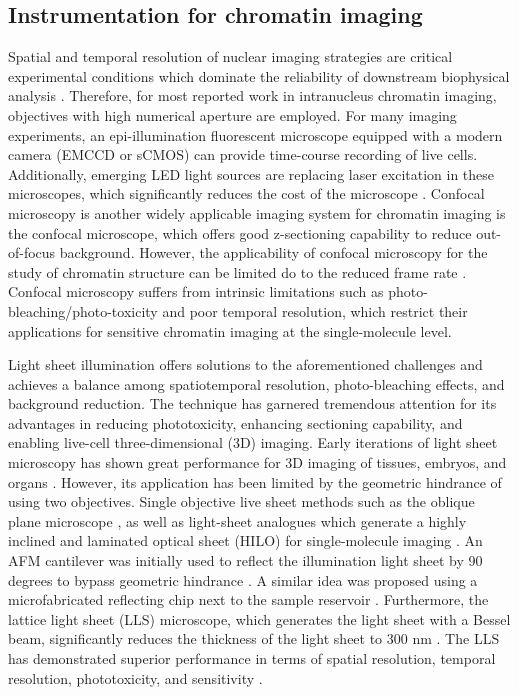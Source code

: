 \subsection{Instrumentation for chromatin imaging}

Spatial and temporal resolution of nuclear imaging strategies are critical experimental conditions which dominate the reliability of downstream biophysical analysis \parencite{Burov2013}. Therefore, for most reported work in intranucleus chromatin imaging, objectives with high numerical aperture are employed. For many imaging experiments, an epi-illumination fluorescent microscope equipped with a modern camera (EMCCD or sCMOS) can provide time-course recording of live cells. Additionally, emerging LED light sources are replacing laser excitation in these microscopes, which significantly reduces the cost of the microscope \parencite{Albeanu2008,Hattori2009,Zheng2013}. Confocal microscopy is another widely applicable imaging system for chromatin imaging is the confocal microscope, which offers good z-sectioning capability to reduce out-of-focus background. However, the applicability of confocal microscopy for the study of chromatin structure can be limited do to the reduced frame rate \parencite{Shukron2019}. Confocal microscopy suffers from intrinsic limitations such as photo-bleaching/photo-toxicity and poor temporal resolution, which restrict their applications for sensitive chromatin imaging at the single-molecule level.

Light sheet illumination offers solutions to the aforementioned challenges and achieves a balance among spatiotemporal resolution, photo-bleaching effects, and background reduction. The technique has garnered tremendous attention for its advantages in reducing phototoxicity, enhancing sectioning capability, and enabling live-cell three-dimensional (3D) imaging. Early iterations of light sheet microscopy has shown great performance for 3D imaging of tissues, embryos, and organs \parencite{Keller2015,Keller2010,Keller2008,Tomer2011}. However, its application has been limited by the geometric hindrance of using two objectives. Single objective live sheet methods such as the oblique plane microscope \parencite{Sapoznik2020}, as well as light-sheet analogues which generate a highly inclined and laminated optical sheet (HILO) for single-molecule imaging \parencite{Tokunaga2008}. An AFM cantilever was initially used to reflect the illumination light sheet by 90 degrees to bypass geometric hindrance \parencite{Gebhardt2013}. A similar idea was proposed using a microfabricated reflecting chip next to the sample reservoir \parencite{Galland2015}. Furthermore, the lattice light sheet (LLS) microscope, which generates the light sheet with a Bessel beam, significantly reduces the thickness of the light sheet to 300 nm \parencite{Chen2014}. The LLS has demonstrated superior performance in terms of spatial resolution, temporal resolution, phototoxicity, and sensitivity \parencite{Gao2019}.


